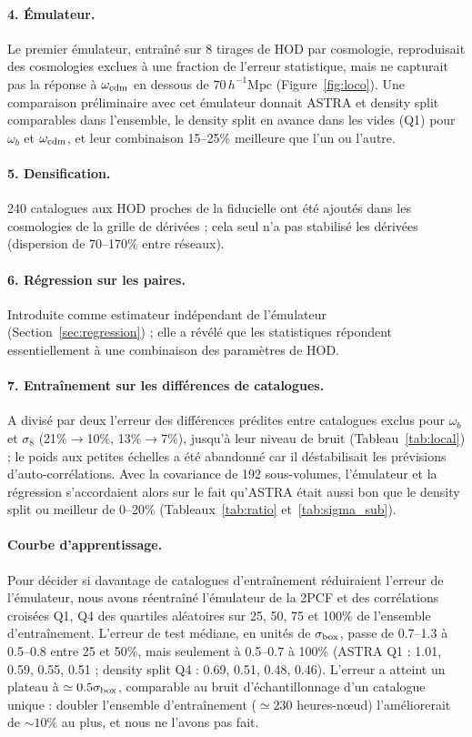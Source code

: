 \documentclass[11pt,twocolumn]{article}
\newcommand{\Mpch}{\,h^{-1}\mathrm{Mpc}}
\begin{document}
\paragraph{4. Émulateur.} Le premier émulateur, entraîné sur 8 tirages de HOD par cosmologie, reproduisait des cosmologies exclues à une fraction de l'erreur statistique, mais ne capturait pas la réponse à $\omega_{\rm cdm}$ en dessous de $70\Mpch$ (Figure~\ref{fig:loco}). Une comparaison préliminaire avec cet émulateur donnait ASTRA et density split comparables dans l'ensemble, le density split en avance dans les vides (Q1) pour $\omega_b$ et $\omega_{\rm cdm}$, et leur combinaison 15--25\% meilleure que l'un ou l'autre.

\paragraph{5. Densification.} 240 catalogues aux HOD proches de la fiducielle ont été ajoutés dans les cosmologies de la grille de dérivées ; cela seul n'a pas stabilisé les dérivées (dispersion de 70--170\% entre réseaux).

\paragraph{6. Régression sur les paires.} Introduite comme estimateur indépendant de l'émulateur (Section~\ref{sec:regression}) ; elle a révélé que les statistiques répondent essentiellement à une combinaison des paramètres de HOD.

\paragraph{7. Entraînement sur les différences de catalogues.} A divisé par deux l'erreur des différences prédites entre catalogues exclus pour $\omega_b$ et $\sigma_8$ (21\%$\to$10\%, 13\%$\to$7\%), jusqu'à leur niveau de bruit (Tableau~\ref{tab:local}) ; le poids aux petites échelles a été abandonné car il déstabilisait les prévisions d'auto-corrélations. Avec la covariance de 192 sous-volumes, l'émulateur et la régression s'accordaient alors sur le fait qu'ASTRA était aussi bon que le density split ou meilleur de 0--20\% (Tableaux~\ref{tab:ratio} et~\ref{tab:sigma_sub}).

\paragraph{Courbe d'apprentissage.} Pour décider si davantage de catalogues d'entraînement réduiraient l'erreur de l'émulateur, nous avons réentraîné l'émulateur de la 2PCF et des corrélations croisées Q1, Q4 des quartiles aléatoires sur 25, 50, 75 et 100\% de l'ensemble d'entraînement. L'erreur de test médiane, en unités de $\sigma_{\rm box}$, passe de 0.7--1.3 à 0.5--0.8 entre 25 et 50\%, mais seulement à 0.5--0.7 à 100\% (ASTRA Q1 : 1.01, 0.59, 0.55, 0.51 ; density split Q4 : 0.69, 0.51, 0.48, 0.46). L'erreur a atteint un plateau à $\simeq0.5\sigma_{\rm box}$, comparable au bruit d'échantillonnage d'un catalogue unique : doubler l'ensemble d'entraînement ($\simeq230$ heures-nœud) l'améliorerait de $\sim10\%$ au plus, et nous ne l'avons pas fait.
\end{document}
